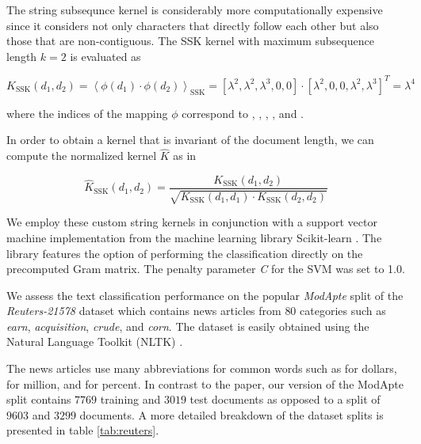 
The string subsequnce kernel is considerably more computationally expensive since it considers not only characters that directly follow each other but also those that are non-contiguous. The SSK kernel with maximum subsequence length $k = 2$ is evaluated as

\begin{equation} \label{eq:ssk}
  K_\text{SSK}(d_1, d_2) = \left\langle \phi(d_1) \cdot \phi(d_2) \right\rangle_\text{SSK} = [\lambda^2, \lambda^2, \lambda^3, 0, 0] \cdot [\lambda^2, 0, 0, \lambda^2, \lambda^3]^T = \lambda^4
\end{equation}

where the indices of the mapping $\phi$ correspond to , , , , and .

In order to obtain a kernel that is invariant of the document length, we can compute the normalized kernel $\hat{K}$ as in

\begin{equation}
  \hat{K}_\text{SSK}(d_1, d_2) = \frac{K_\text{SSK}(d_1, d_2)}{\sqrt{K_\text{SSK}(d_1, d_1) \cdot K_\text{SSK}(d_2, d_2)}}
\end{equation}



We employ these custom string kernels in conjunction with a support vector machine implementation from the machine learning library Scikit-learn \cite{sklearn}. The library features the option of performing the classification directly on the precomputed Gram matrix. The penalty parameter \textit{C} for the SVM was set to 1.0. 

We assess the text classification performance on the popular \textit{ModApte} split of the \textit{Reuters-21578} dataset which contains news articles from $80$ categories such as \textit{earn}, \textit{acquisition}, \textit{crude}, and \textit{corn}. The dataset is easily obtained using the Natural Language Toolkit (NLTK) \cite{nltk}.

The news articles use many abbreviations for common words such as  for dollars,  for million, and  for percent. In contrast to the paper, our version of the ModApte split contains $7769$ training and $3019$ test documents as opposed to a split of $9603$ and $3299$ documents. A more detailed breakdown of the dataset splits is presented in table \ref{tab:reuters}.



